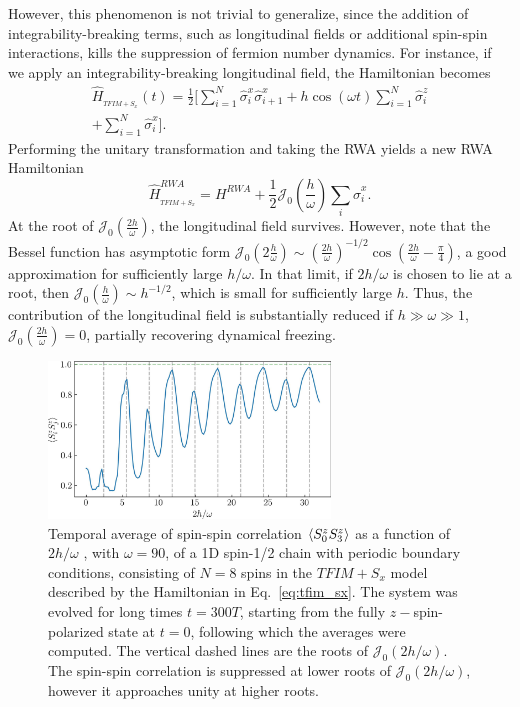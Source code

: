 \documentclass[%
reprint,
superscriptaddress,
amsmath,amssymb,
aps,
prb,
showkeys,
]{revtex4-2}
\begin{document}
However, this phenomenon is not trivial to generalize, since the addition of integrability-breaking terms, such as longitudinal fields or additional spin-spin interactions, kills the suppression of fermion number dynamics.  For instance, if we apply an integrability-breaking longitudinal field, the Hamiltonian becomes 
\begin{multline}
\hat{H}_{_{TFIM+S_{x}}}(t) =\frac12 \Big[\sum^N_{i=1}  \hat{\sigma}_{i}^{x} \hat{\sigma}_{i+1}^{x}+h \cos (\omega t) \sum^N_{i=1} \hat{\sigma}_{i}^{z}\\
+\sum^N_{i=1} \hat{\sigma}_{i}^{x}\Big].
\label{eq:tfim_sx}
\end{multline}	
Performing the unitary transformation and taking the RWA yields a new RWA Hamiltonian
\begin{equation}
	\hat{H}_{_{TFIM+S_{x}}}^{R W A}= H^{RWA}+\frac12 \mathcal{J}_{0}\left(\frac{h}{\omega}\right) \sum_i\hat{\sigma}^x_i.
	\label{eq:tfim_sx1}
\end{equation}
At the root of $\mathcal{J}_0\left(\frac{2h}{\omega}\right)$, the longitudinal field survives. However, note that the Bessel function has asymptotic form $\mathcal{J}_0\left(2\frac{h}{\omega}\right)\sim \left(\frac{2h}{\omega}\right)^{-1/2}\cos\left(\frac{2h}{\omega}-\frac{\pi}{4}\right)$, a good approximation for sufficiently  large $h/\omega$. In that limit, if $2h/\omega$ is chosen to lie at a root, then $\mathcal{J}_0\left(\frac{h}{\omega}\right) \sim h^{-1/2}$, which is small for sufficiently large $h$. Thus, the contribution of the longitudinal field is substantially reduced if $h\gg\omega\gg1$, $\mathcal{J}_0\left(\frac{2h}{\omega}\right)=0$, partially recovering dynamical freezing.
\begin{figure}[t!]
	\centering
	\includegraphics[width = 7.5cm]{corrN8sz0sz3avg_onlynn_tfim_sx.jpeg}
	\caption{Temporal average of spin-spin correlation $\expval{S^z_0 S^z_3}$ as a function of $2h/\omega$ , with $\omega=90$, of a 1D spin-1/2 chain with periodic boundary conditions, consisting of $N=8$ spins in the $TFIM+S_x$ model described by the Hamiltonian in Eq.~\ref{eq:tfim_sx}. The system was evolved for long times $t=300T$, starting from the fully $z-$spin-polarized state at $t=0$,  following which the averages were computed.  The  vertical dashed lines are the roots of $\mathcal{J}_0\left(2h/\omega\right)$. The spin-spin correlation is suppressed at lower roots  of $\mathcal{J}_0\left(2h/\omega\right)$, however it approaches unity at higher roots.}
	\label{fig:ipr:tfimsx}
\end{figure}
\end{document}
